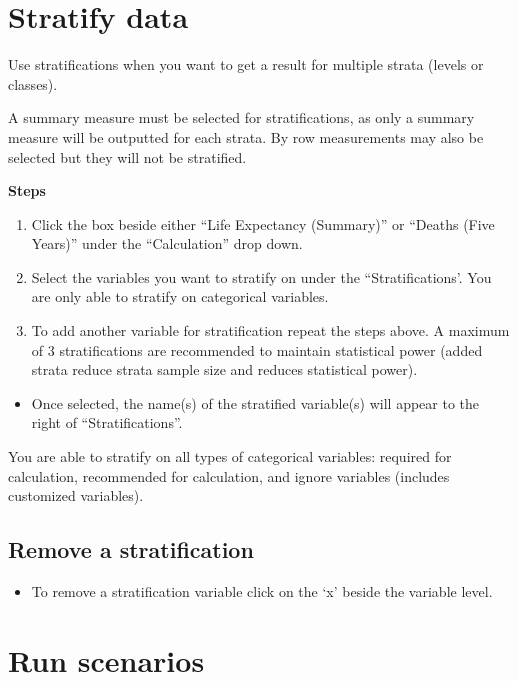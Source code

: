 \documentclass[]{book}
\providecommand{\tightlist}{%
  \setlength{\itemsep}{0pt}\setlength{\parskip}{0pt}}
\begin{document}
\section{Stratify data}\label{stratify-data}

Use stratifications when you want to get a result for multiple strata
(levels or classes).

A summary measure must be selected for stratifications, as only a
summary measure will be outputted for each strata. By row measurements
may also be selected but they will not be stratified.

\textbf{Steps}

\begin{enumerate}
\def\labelenumi{\arabic{enumi}.}
\item
  Click the box beside either ``Life Expectancy (Summary)'' or ``Deaths
  (Five Years)'' under the ``Calculation'' drop down.
\item
  Select the variables you want to stratify on under the
  ``Stratifications'. You are only able to stratify on categorical
  variables.
\item
  To add another variable for stratification repeat the steps above. A
  maximum of 3 stratifications are recommended to maintain statistical
  power (added strata reduce strata sample size and reduces statistical
  power).
\end{enumerate}

\begin{itemize}
\tightlist
\item
  Once selected, the name(s) of the stratified variable(s) will appear
  to the right of ``Stratifications''.
\end{itemize}

You are able to stratify on all types of categorical variables: required
for calculation, recommended for calculation, and ignore variables
(includes customized variables).

\subsection{Remove a stratification}\label{remove-a-stratification}

\begin{itemize}
\tightlist
\item
  To remove a stratification variable click on the `x' beside the
  variable level.
\end{itemize}

\section{Run scenarios}\label{run-scenarios}
\end{document}

